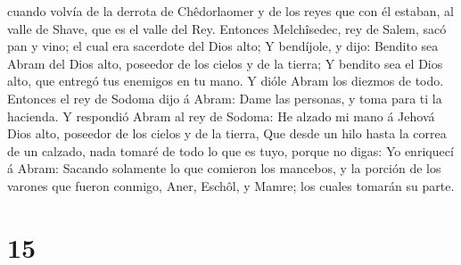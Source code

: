 cuando volvía de la derrota de Chêdorlaomer y de los reyes que con él
estaban, al valle de Shave, que es el valle del Rey. 
Entonces Melchîsedec, rey de Salem, sacó pan y vino; el cual era
sacerdote del Dios alto;  Y bendíjole, y dijo: Bendito sea
Abram del Dios alto, poseedor de los cielos y de la tierra;
 Y bendito sea el Dios alto, que entregó tus enemigos en tu
mano. Y dióle Abram los diezmos de todo.  Entonces el rey
de Sodoma dijo á Abram: Dame las personas, y toma para ti la hacienda.
 Y respondió Abram al rey de Sodoma: He alzado mi mano á
Jehová Dios alto, poseedor de los cielos y de la tierra, 
Que desde un hilo hasta la correa de un calzado, nada tomaré de todo lo
que es tuyo, porque no digas: Yo enriquecí á Abram: 
Sacando solamente lo que comieron los mancebos, y la porción de los
varones que fueron conmigo, Aner, Eschôl, y Mamre; los cuales tomarán su
parte.

\hypertarget{section-14}{%
\section{15}\label{section-14}}

